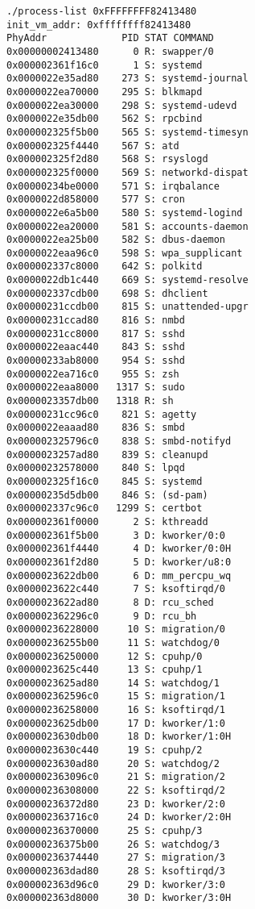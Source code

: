 \begin{itembox}[l]{}
    \begin{verbatim}
./process-list 0xFFFFFFFF82413480
init_vm_addr: 0xffffffff82413480
PhyAddr             PID STAT COMMAND
0x00000002413480      0 R: swapper/0
0x000002361f16c0      1 S: systemd
0x0000022e35ad80    273 S: systemd-journal
0x0000022ea70000    295 S: blkmapd
0x0000022ea30000    298 S: systemd-udevd
0x0000022e35db00    562 S: rpcbind
0x000002325f5b00    565 S: systemd-timesyn
0x000002325f4440    567 S: atd
0x000002325f2d80    568 S: rsyslogd
0x000002325f0000    569 S: networkd-dispat
0x00000234be0000    571 S: irqbalance
0x0000022d858000    577 S: cron
0x0000022e6a5b00    580 S: systemd-logind
0x0000022ea20000    581 S: accounts-daemon
0x0000022ea25b00    582 S: dbus-daemon
0x0000022eaa96c0    598 S: wpa_supplicant
0x000002337c8000    642 S: polkitd
0x0000022db1c440    669 S: systemd-resolve
0x000002337cdb00    698 S: dhclient
0x00000231ccdb00    815 S: unattended-upgr
0x00000231ccad80    816 S: nmbd
0x00000231cc8000    817 S: sshd
0x0000022eaac440    843 S: sshd
0x00000233ab8000    954 S: sshd
0x0000022ea716c0    955 S: zsh
0x0000022eaa8000   1317 S: sudo
0x0000023357db00   1318 R: sh
0x00000231cc96c0    821 S: agetty
0x0000022eaaad80    836 S: smbd
0x000002325796c0    838 S: smbd-notifyd
0x0000023257ad80    839 S: cleanupd
0x00000232578000    840 S: lpqd
0x000002325f16c0    845 S: systemd
0x00000235d5db00    846 S: (sd-pam)
0x000002337c96c0   1299 S: certbot
0x000002361f0000      2 S: kthreadd
0x000002361f5b00      3 D: kworker/0:0
0x000002361f4440      4 D: kworker/0:0H
0x000002361f2d80      5 D: kworker/u8:0
0x0000023622db00      6 D: mm_percpu_wq
0x0000023622c440      7 S: ksoftirqd/0
0x0000023622ad80      8 D: rcu_sched
0x000002362296c0      9 D: rcu_bh
0x00000236228000     10 S: migration/0
0x00000236255b00     11 S: watchdog/0
0x00000236250000     12 S: cpuhp/0
0x0000023625c440     13 S: cpuhp/1
0x0000023625ad80     14 S: watchdog/1
0x000002362596c0     15 S: migration/1
0x00000236258000     16 S: ksoftirqd/1
0x0000023625db00     17 D: kworker/1:0
0x0000023630db00     18 D: kworker/1:0H
0x0000023630c440     19 S: cpuhp/2
0x0000023630ad80     20 S: watchdog/2
0x000002363096c0     21 S: migration/2
0x00000236308000     22 S: ksoftirqd/2
0x00000236372d80     23 D: kworker/2:0
0x000002363716c0     24 D: kworker/2:0H
0x00000236370000     25 S: cpuhp/3
0x00000236375b00     26 S: watchdog/3
0x00000236374440     27 S: migration/3
0x000002363dad80     28 S: ksoftirqd/3
0x000002363d96c0     29 D: kworker/3:0
0x000002363d8000     30 D: kworker/3:0H

\end{verbatim}
\end{itembox}
